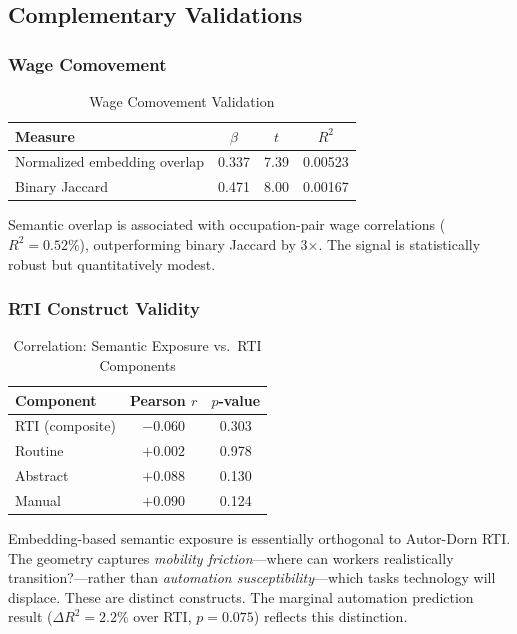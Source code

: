 \documentclass[12pt]{article}
\begin{document}
\subsection{Complementary Validations}
\label{subsec:complementary}


\subsubsection{Wage Comovement}


\begin{table}[h!]
\centering
\caption{Wage Comovement Validation}
\label{tab:wage-comovement}
\begin{tabular}{lccc}
\toprule
\textbf{Measure} & $\beta$ & $t$ & $R^2$ \\
\midrule
Normalized embedding overlap & 0.337 & 7.39 & 0.00523 \\
Binary Jaccard & 0.471 & 8.00 & 0.00167 \\
\bottomrule
\end{tabular}
\end{table}


Semantic overlap is associated with occupation-pair wage correlations ($R^2 = 0.52\%$), outperforming binary Jaccard by 3$\times$. The signal is statistically robust but quantitatively modest.


\subsubsection{RTI Construct Validity}


\begin{table}[h!]
\centering
\caption{Correlation: Semantic Exposure vs.\ RTI Components}
\label{tab:rti-correlation}
\begin{tabular}{lcc}
\toprule
\textbf{Component} & \textbf{Pearson $r$} & \textbf{$p$-value} \\
\midrule
RTI (composite) & $-0.060$ & 0.303 \\
Routine & $+0.002$ & 0.978 \\
Abstract & $+0.088$ & 0.130 \\
Manual & $+0.090$ & 0.124 \\
\bottomrule
\end{tabular}
\end{table}


Embedding-based semantic exposure is essentially orthogonal to Autor-Dorn RTI. The geometry captures \emph{mobility friction}---where can workers realistically transition?---rather than \emph{automation susceptibility}---which tasks technology will displace. These are distinct constructs. The marginal automation prediction result ($\Delta R^2 = 2.2\%$ over RTI, $p = 0.075$) reflects this distinction.
\end{document}
